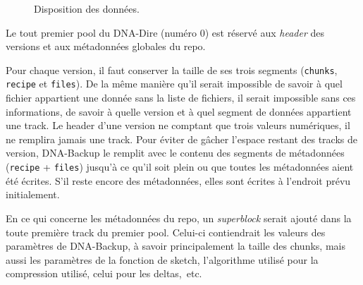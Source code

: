 \documentclass[a4paper]{report}
\begin{document}
\begin{figure}[ht]
\centering


\caption{Disposition des données.}
\label{fig:data-layout}
\end{figure}

Le tout premier pool du DNA-Dire (numéro 0) est réservé aux \emph{header} des versions
et aux métadonnées globales du repo.

Pour chaque version, il faut conserver la taille de ses trois segments
(\verb|chunks|, \verb|recipe| et \verb|files|).
De la même manière qu'il serait impossible de savoir
à quel fichier appartient une donnée sans la liste de fichiers,
il serait impossible sans ces informations, de savoir
à quelle version et à quel segment de données appartient une track.
Le header d'une version ne comptant que trois valeurs numériques, il ne remplira jamais une track.
Pour éviter de gâcher l'espace restant des tracks de version,
DNA-Backup le remplit avec le contenu des segments de métadonnées (\verb|recipe| + \verb|files|)
jusqu'à ce qu'il soit plein ou que toutes les métadonnées aient été écrites.
S'il reste encore des métadonnées, elles sont écrites à l'endroit prévu initialement.

En ce qui concerne les métadonnées du repo,
un \emph{superblock} serait ajouté dans la toute première track du premier pool.
Celui-ci contiendrait les valeurs des paramètres de DNA-Backup,
à savoir principalement la taille des chunks, mais aussi les paramètres de la fonction de sketch,
l'algorithme utilisé pour la compression utilisé, celui pour les deltas,~etc.
\end{document}
